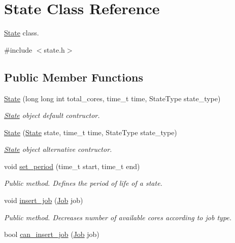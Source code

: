 \hypertarget{classState}{}\section{State Class Reference}
\label{classState}


\hyperlink{classState}{State} class.  




{\ttfamily \#include $<$state.\+h$>$}

\subsection*{Public Member Functions}
\begin{DoxyCompactItemize}
\item 
\hyperlink{classState_a08aed9caf1cc4d3be0ba98ec6ce361b6}{State} (long long int total\+\_\+cores, time\+\_\+t time, State\+Type state\+\_\+type)
\begin{DoxyCompactList}\small\item\em \hyperlink{classState}{State} object default contructor. \end{DoxyCompactList}\item 
\hyperlink{classState_a5c1f8c662bc19d86e5b63104b7be9a1c}{State} (\hyperlink{classState}{State} state, time\+\_\+t time, State\+Type state\+\_\+type)
\begin{DoxyCompactList}\small\item\em \hyperlink{classState}{State} object alternative contructor. \end{DoxyCompactList}\item 
void \hyperlink{classState_a576b0286b5b9bb517b45c29749f5563c}{set\+\_\+period} (time\+\_\+t start, time\+\_\+t end)
\begin{DoxyCompactList}\small\item\em Public method. Defines the period of life of a state. \end{DoxyCompactList}\item 
void \hyperlink{classState_a03e0b92997f17eed2272c67cfcdd889a}{insert\+\_\+job} (\hyperlink{classJob}{Job} job)
\begin{DoxyCompactList}\small\item\em Public method. Decreases number of available cores according to job type. \end{DoxyCompactList}\item 
bool \hyperlink{classState_a5307764c6bd8793d84b791c47e847635}{can\+\_\+insert\+\_\+job} (\hyperlink{classJob}{Job} job)

\end{DoxyCompactItemize}
